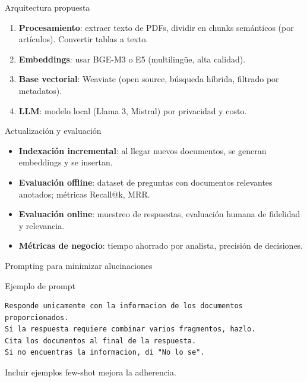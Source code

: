 \documentclass[aspectratio=169, 10pt, xcolor=table]{beamer}
\begin{document}
\begin{frame}{Arquitectura propuesta}
    \begin{enumerate}
        \item \textbf{Procesamiento}: extraer texto de PDFs, dividir en chunks sem\'anticos (por art\'iculos). Convertir tablas a texto.
        \item \textbf{Embeddings}: usar BGE-M3 o E5 (multiling\"ue, alta calidad).
        \item \textbf{Base vectorial}: Weaviate (open source, b\'usqueda h\'ibrida, filtrado por metadatos).
        \item \textbf{LLM}: modelo local (Llama 3, Mistral) por privacidad y costo.
    \end{enumerate}
\end{frame}

\begin{frame}{Actualizaci\'on y evaluaci\'on}
    \begin{itemize}
        \item \textbf{Indexaci\'on incremental}: al llegar nuevos documentos, se generan embeddings y se insertan.
        \item \textbf{Evaluaci\'on offline}: dataset de preguntas con documentos relevantes anotados; m\'etricas Recall@k, MRR.
        \item \textbf{Evaluaci\'on online}: muestreo de respuestas, evaluaci\'on humana de fidelidad y relevancia.
        \item \textbf{M\'etricas de negocio}: tiempo ahorrado por analista, precisi\'on de decisiones.
    \end{itemize}
\end{frame}

\begin{frame}[fragile]{Prompting para minimizar alucinaciones}
    \begin{block}{Ejemplo de prompt}
        \begin{lstlisting}
Responde unicamente con la informacion de los documentos proporcionados.
Si la respuesta requiere combinar varios fragmentos, hazlo.
Cita los documentos al final de la respuesta.
Si no encuentras la informacion, di "No lo se".
        \end{lstlisting}
    \end{block}
    Incluir ejemplos few-shot mejora la adherencia.
\end{frame}

\end{document}
